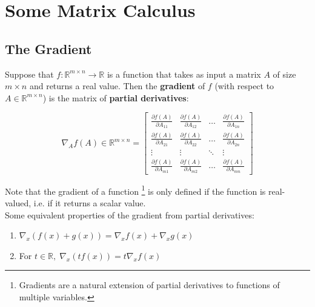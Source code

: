 \documentclass{article}
\begin{document}
\section{Some Matrix Calculus}

\subsection{The Gradient}

\begin{definition}
    
Suppose that $f: \mathbb{R}^{m\times n}\to \mathbb{R}$ is a function that takes as input a matrix $A$ of size $m\times n$ and returns a real value. Then the \textbf{gradient} of $f$ (with respect to $A\in \mathbb{R}^{m\times n}$) is the matrix of \textbf{partial derivatives}:

\begin{equation}
    \nabla_A f(A) \in \mathbb{R}^{m\times n} = \begin{bmatrix}
        \frac{\partial f(A)}{\partial A_{11}} & \frac{\partial f(A)}{\partial A_{12}} & \dots & \frac{\partial f(A)}{\partial A_{1n}} \\ 
        \frac{\partial f(A)}{\partial A_{21}} & \frac{\partial f(A)}{\partial A_{22}} & \dots & \frac{\partial f(A)}{\partial A_{2n}} \\ 
        \vdots & \vdots & \ddots & \vdots \\ 
        \frac{\partial f(A)}{\partial A_{m1}} & \frac{\partial f(A)}{\partial A_{m2}} &  \dots & \frac{\partial f(A)}{\partial A_{mn}}
    \end{bmatrix}
\end{equation}

\end{definition}

\noindent Note that the gradient of a function \footnote{Gradients are a natural extension of partial derivatives to functions of multiple variables.} is only defined if the function is real-valued, i.e. if it returns a scalar value. \\

\noindent Some equivalent properties of the gradient from partial derivatives:

\begin{enumerate}
    \item $\nabla_x (f(x) + g(x)) = \nabla_x f(x) + \nabla_x g(x)$
    \item For $t \in \mathbb{R}, \; \nabla_x(t f(x)) = t\nabla_x f(x)$
\end{enumerate}
\end{document}
